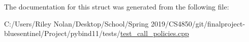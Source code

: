 The documentation for this struct was generated from the following file\+:\begin{DoxyCompactItemize}
\item 
C\+:/\+Users/\+Riley Nolan/\+Desktop/\+School/\+Spring 2019/\+C\+S4850/git/finalproject-\/bluesentinel/\+Project/pybind11/tests/\mbox{\hyperlink{test__call__policies_8cpp}{test\+\_\+call\+\_\+policies.\+cpp}}\end{DoxyCompactItemize}
